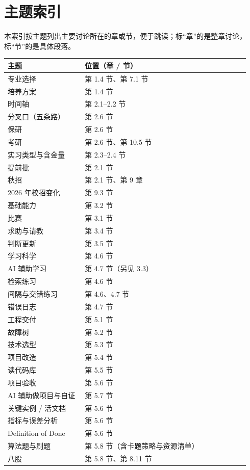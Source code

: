 \documentclass[UTF8,zihao=5,openany]{ctexbook}
\begin{document}
\chapter{主题索引}
本索引按主题列出主要讨论所在的章或节，便于跳读；标“章”的是整章讨论，标“节”的是具体段落。

{\small\begin{longtable}{p{0.30\linewidth}p{0.64\linewidth}}
\toprule
主题 & 位置（章 / 节） \\
\midrule
专业选择 & 第 1.4 节、第 7.1 节 \\
培养方案 & 第 1.4 节 \\
时间轴 & 第 2.1–2.2 节 \\
分叉口（五条路） & 第 2.6 节 \\
保研 & 第 2.6 节 \\
考研 & 第 2.6 节、第 10.5 节 \\
实习类型与含金量 & 第 2.3–2.4 节 \\
提前批 & 第 2.1 节 \\
秋招 & 第 2.1 节、第 9 章 \\
2026 年校招变化 & 第 9.3 节 \\
基础能力 & 第 3.2 节 \\
比赛 & 第 3.1 节 \\
求助与请教 & 第 3.4 节 \\
判断更新 & 第 3.5 节 \\
学习科学 & 第 4.6 节 \\
AI 辅助学习 & 第 4.7 节（另见 3.3） \\
检索练习 & 第 4.6 节 \\
间隔与交错练习 & 第 4.6、4.7 节 \\
错误日志 & 第 4.7 节 \\
工程交付 & 第 5.1 节 \\
故障树 & 第 5.2 节 \\
技术选型 & 第 5.3 节 \\
项目改造 & 第 5.4 节 \\
读代码库 & 第 5.5 节 \\
项目验收 & 第 5.6 节 \\
AI 辅助做项目与自证 & 第 5.7 节 \\
关键实例 / 活文档 & 第 5.6 节 \\
指标与误差分析 & 第 5.6 节 \\
Definition of Done & 第 5.6 节 \\
算法题与刷题 & 第 5.8 节（含卡题策略与资源清单） \\
八股 & 第 5.8 节、第 8.11 节 \\

\end{longtable}}
\end{document}
